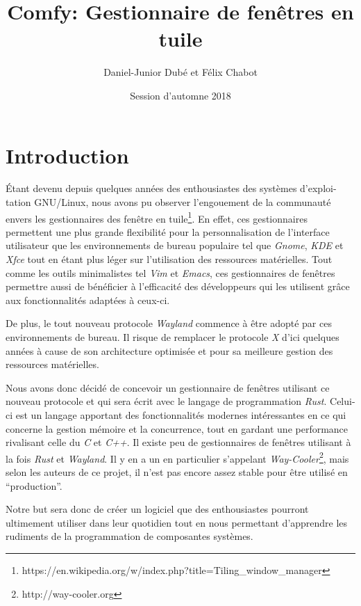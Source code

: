 \documentclass[titlepage]{article}
\title{Comfy: Gestionnaire de fenêtres en tuile}
\author{Daniel-Junior Dubé et Félix Chabot}
\date{Session d'automne 2018}
\begin{document}
    \maketitle

    \renewcommand{\contentsname}{Table des matières}
    \tableofcontents
    \newpage

    \section{Introduction}
    \par
	Étant devenu depuis quelques années des enthousiastes des systèmes d'exploi-tation GNU/Linux, nous avons pu observer l’engouement de la communauté envers les gestionnaires des fenêtre en tuile\footnote{https://en.wikipedia.org/w/index.php?title=Tiling\_window\_manager}. En effet, ces gestionnaires permettent une plus grande flexibilité pour la personnalisation de l’interface utilisateur que les environnements de bureau populaire tel que \textit{Gnome}, \textit{KDE} et \textit{Xfce} tout en étant plus léger sur l’utilisation des ressources matérielles. Tout comme les outils minimalistes tel \textit{Vim} et \textit{Emacs}, ces gestionnaires de fenêtres permettre aussi de bénéficier à l’efficacité des développeurs qui les utilisent grâce aux fonctionnalités adaptées à ceux-ci.

    \par
    \bigskip
    De plus, le tout nouveau protocole \textit{Wayland} commence à être adopté par ces environnements de bureau. Il risque de remplacer le protocole \textit{X} d'ici quelques années à cause de son architecture optimisée et pour sa meilleure gestion des ressources matérielles.

    \par
    \bigskip
	Nous avons donc décidé de concevoir un gestionnaire de fenêtres utilisant ce nouveau protocole et qui sera écrit avec le langage de programmation \textit{Rust}. Celui-ci est un langage apportant des fonctionnalités modernes intéressantes en ce qui concerne la gestion mémoire et la concurrence, tout en gardant une performance rivalisant celle du \textit{C} et \textit{C++}. Il existe peu de gestionnaires de fenêtres utilisant à la fois \textit{Rust} et \textit{Wayland}. Il y en a un en particulier s’appelant \textit{Way-Cooler}\footnote{http://way-cooler.org}, mais selon les auteurs de ce projet, il n’est pas encore assez stable pour être utilisé en “production”.

    \par
    \bigskip
    Notre but sera donc de créer un logiciel que des enthousiastes pourront ultimement utiliser dans leur quotidien tout en nous permettant d’apprendre les rudiments de la programmation de composantes systèmes.
\end{document}
